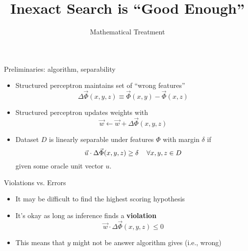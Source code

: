 \documentclass[compress]{beamer}
\title{Inexact Search is ``Good Enough''}
\date{Mathematical Treatment}
\begin{document}
\frame{
\titlepage
}

\begin{frame}{Preliminaries: algorithm, separability}

  \begin{itemize}
    \item Structured perceptron maintains set of ``wrong features''
\begin{equation}
\Delta \vec \Phi (x, y, z) \equiv \vec \Phi(x, y) - \vec \Phi(x, z)
\end{equation}
    \item Structured perceptron updates weights with
\begin{equation}
\vec w \leftarrow \vec w + \Delta \vec \Phi (x, y, z)
\end{equation}
\item Dataset $D$ is linearly separable under features $\Phi$ with margin $\delta$ if
\begin{equation}
\vec u \cdot \Delta \vec \Phi (x, y, z) \geq \delta \hphantom{\dots} \forall x, y, z \in D
\end{equation}
given some oracle unit vector $u$.
  \end{itemize}

\end{frame}


\begin{frame}{Violations vs. Errors}

	\begin{itemize}
                \item It may be difficult to find the highest scoring
                  hypothesis
                 \item It's okay as long as inference finds a {\bf
                     violation}
                   \begin{equation}
                     \vec w \cdot \Delta \vec \Phi(x, y, z) \leq 0
                   \end{equation}
                 \item This means that $y$ might not be answer
                   algorithm gives (i.e., wrong)
	\end{itemize}

\end{frame}
\end{document}
